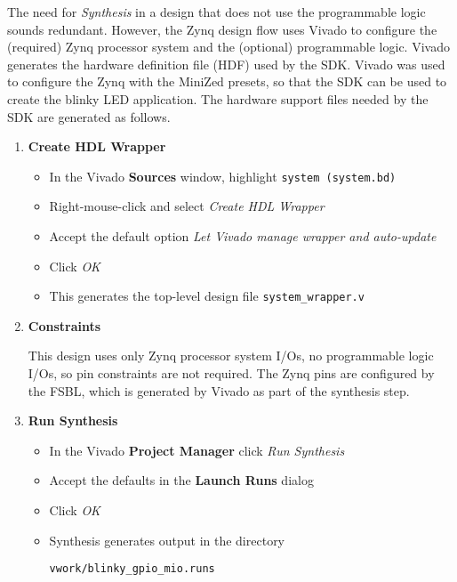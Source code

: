 \begin{enumerate}
The need for \emph{Synthesis} in a design that does not use the programmable
logic sounds redundant. However, the Zynq design flow uses Vivado to configure
the (required) Zynq processor system and the (optional) programmable logic.
%
Vivado generates the hardware definition file (HDF) used by the SDK. Vivado
was used to configure the Zynq with the MiniZed presets, so that the SDK can
be used to create the blinky LED application. The hardware support files needed
by the SDK are generated as follows.
%
\begin{enumerate}
%
\item {\bf Create HDL Wrapper}
%
\begin{itemize}
\item In the Vivado {\bf Sources} window, highlight \verb+system (system.bd)+
\item Right-mouse-click and select \emph{Create HDL Wrapper}
\item Accept the default option \emph{Let Vivado manage wrapper and auto-update}
\item Click \emph{OK}
\item This generates the top-level design file \verb+system_wrapper.v+
\end{itemize}
%
\item {\bf Constraints}

This design uses only Zynq processor system I/Os, no programmable logic I/Os,
so pin constraints are not required. The Zynq pins are configured by the
FSBL, which is generated by Vivado as part of the synthesis step.
%
\item {\bf Run Synthesis}
%
\begin{itemize}
\item In the Vivado {\bf Project Manager} click \emph{Run Synthesis}
\item Accept the defaults in the {\bf Launch Runs} dialog
\item Click \emph{OK}
\item Synthesis generates output in the directory

\verb+vwork/blinky_gpio_mio.runs+


\end{itemize}
\end{enumerate}
\end{enumerate}

